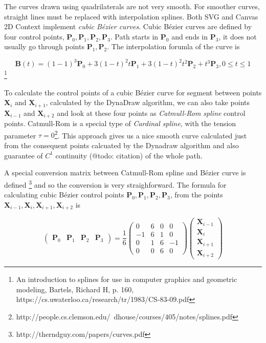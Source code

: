 The curves drawn using quadrilaterals are not very smooth. For smoother curves, straight lines must be replaced with interpolation splines. Both SVG and Canvas 2D Context implement \textit{cubic Bézier curves}. Cubic Bézier curves are defined by four control points, $ \mathbf{P}_0, \mathbf{P}_1, \mathbf{P}_2, \mathbf{P}_3 $. Path starts in $ \mathbf{P}_0 $ and ends in $ \mathbf{P}_3 $, it does not usually go through points $ \mathbf{P}_1, \mathbf{P}_2 $. The interpolation forumla of the curve is

$$ \mathbf{B}(t) = (1 - 1)^3 \mathbf{P}_0 + 3(1-t)^{2}t\mathbf{P}_1 + 3(1-t)^{2}t^2\mathbf{P}_2 + t^3\mathbf{P}_3, 0 \leq t \leq 1$$ \cite{}\footnote{An introduction to splines for use in computer graphics and geometric modeling, Bartels, Richard H, p. 160, https://cs.uwaterloo.ca/research/tr/1983/CS-83-09.pdf}

To calculate the control points of a cubic Bézier curve for segment between points $\mathbf{X}_i$ and $\mathbf{X}_{i+1}$, calculated by the DynaDraw algorithm, we can also take points $\mathbf{X}_{i-1}$ and $\mathbf{X}_{i+2}$ and look at these four points as \textit{Catmull-Rom spline} control points. Catmull-Rom is a special type of \textit{Cardinal spline}, with the tension parameter $\tau = 0$\cite{}\footnote{http://people.cs.clemson.edu/~dhouse/courses/405/notes/splines.pdf}. This approach gives us a nice smooth curve calculated just from the consequent points calcuated by the Dynadraw algorithm and also guarantee of $C^1$ continuity (@todo: citation) of the whole path.

A special conversion matrix between Catmull-Rom spline and Bézier curve is defined \cite{}\footnote{http://therndguy.com/papers/curves.pdf} and so the conversion is very straighforward. The formula for calculating cubic Bézier control points $ \mathbf{P}_0, \mathbf{P}_1, \mathbf{P}_2, \mathbf{P}_3 $, from the points $ \mathbf{X}_{i-1}, \mathbf{X}_i, \mathbf{X}_{i+1}, \mathbf{X}_{i+2} $ is

$$
\begin{pmatrix}\mathbf{P}_0 & \mathbf{P}_1 & \mathbf{P}_{2} & \mathbf{P}_{3} \end{pmatrix} = \frac{1}{6}\begin{pmatrix} 0 & 6 & 0 & 0 \\ -1 & 6 & 1 & 0 \\ 0 & 1 & 6 & -1 \\ 0 & 0 & 6 & 0 \end{pmatrix} \begin{pmatrix} \mathbf{X}_{i-1} \\ \mathbf{X}_i \\ \mathbf{X}_{i+1} \\ \mathbf{X}_{i+2} \end{pmatrix}
$$


